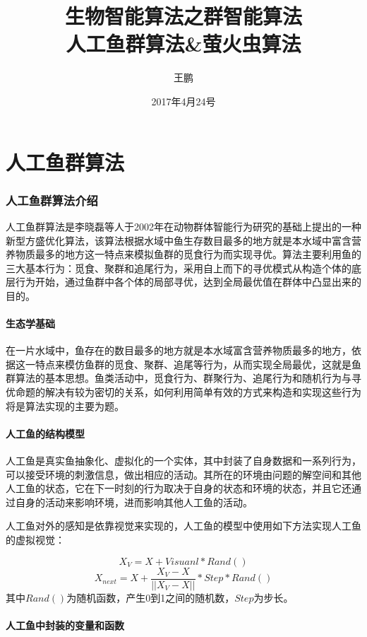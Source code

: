 \documentclass[UTF8]{ctexart}
\begin{document}
\title{生物智能算法之群智能算法\\人工鱼群算法\&萤火虫算法}
\author{王鹏}
\date{2017年4月24号}
\maketitle

\tableofcontents
\newpage
\part{人工鱼群算法}

	\section{人工鱼群算法介绍}人工鱼群算法是李晓磊等人于2002年在动物群体智能行为研究的基础上提出的一种新型方盛优化算法，该算法根据水域中鱼生存数目最多的地方就是本水域中富含营养物质最多的地方这一特点来模拟鱼群的觅食行为而实现寻优。算法主要利用鱼的三大基本行为：觅食、聚群和追尾行为，采用自上而下的寻优模式从构造个体的底层行为开始，通过鱼群中各个体的局部寻优，达到全局最优值在群体中凸显出来的目的。
		\subsection{生态学基础}在一片水域中，鱼存在的数目最多的地方就是本水域富含营养物质最多的地方，依据这一特点来模仿鱼群的觅食、聚群、追尾等行为，从而实现全局最优，这就是鱼群算法的基本思想。鱼类活动中，觅食行为、群聚行为、追尾行为和随机行为与寻优命题的解决有较为密切的关系，如何利用简单有效的方式来构造和实现这些行为将是算法实现的主要为题。
		\subsection{人工鱼的结构模型}人工鱼是真实鱼抽象化、虚拟化的一个实体，其中封装了自身数据和一系列行为，可以接受环境的刺激信息，做出相应的活动。其所在的环境由问题的解空间和其他人工鱼的状态，它在下一时刻的行为取决于自身的状态和环境的状态，并且它还通过自身的活动来影响环境，进而影响其他人工鱼的活动。\par
			人工鱼对外的感知是依靠视觉来实现的，人工鱼的模型中使用如下方法实现人工鱼的虚拟视觉：\par
				$$X_V = X + Visuanl*Rand()$$
				$$X_{next} = X + \frac{X_V - X}{||X_V - X||}*Step*Rand()$$
			其中$Rand()$为随机函数，产生0到1之间的随机数，$Step$为步长。
		\subsection{人工鱼中封装的变量和函数}
\end{document}
